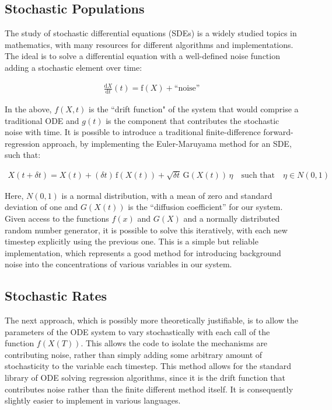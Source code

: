 \documentclass[a4paper, 12pt]{report}
\begin{document}
\subsection{Stochastic Populations}

The study of stochastic differential equations (SDEs) is a widely studied topics in mathematics, with many resources for different algorithms and implementations. The ideal is to solve a differential equation with a well-defined noise function adding a stochastic element over time:

\begin{align}
\frac{\mathrm d X}{\mathrm d t}(t) = \mathrm f (X) + \text{``noise''}
\end{align}

In the above, $f(X,t)$ is the ``drift function" of the system that would comprise a traditional ODE and $g(t)$ is the component that contributes the stochastic noise with time. It is possible to introduce a traditional finite-difference forward-regression approach, by implementing the Euler-Maruyama method for an SDE, such that:

\begin{align}
X(t+\delta t) = X(t) + (\delta t)\, \mathrm f (X(t)) + \sqrt{ \delta t}\, \mathrm G (X(t))\, \eta \quad \text{such that} \quad \eta \in N(0,1)
\end{align}

Here, $N(0,1)$ is a normal distribution, with a mean of zero and standard deviation of one and $G(X(t))$ is the ``diffusion coefficient'' for our system. Given access to the functions $f(x)$ and $G(X)$ and a normally distributed random number generator, it is possible to solve this iteratively, with each new timestep explicitly using the previous one. This is a simple but reliable implementation, which represents a good method for introducing background noise into the concentrations of various variables in our system.

\subsection{Stochastic Rates}

The next approach, which is possibly more theoretically justifiable, is to allow the parameters of the ODE system to vary stochastically with each call of the function $f(X(T))$. This allows the code to isolate the mechanisms are contributing noise, rather than simply adding some arbitrary amount of stochasticity to the variable each timestep. This method allows for the standard library of ODE solving regression algorithms, since it is the drift function that contributes noise rather than the finite different method itself. It is consequently slightly easier to implement in various languages.
\end{document}
